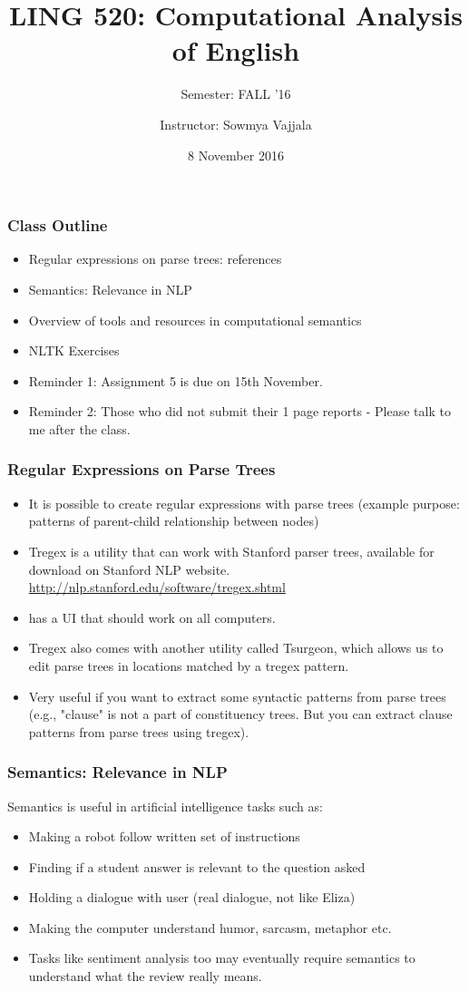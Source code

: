 \documentclass{beamer}
\author[Sowmya Vajjala]{Instructor: Sowmya Vajjala}
\title[LING 520]{LING 520: Computational Analysis of English}
\subtitle{Semester: FALL '16}
\date{8 November 2016}
\institute{Iowa State University, USA}
\begin{document}
\begin{frame}\titlepage
\end{frame}

\begin{frame}
\frametitle{Class Outline}
\begin{itemize}
\item Regular expressions on parse trees: references %
\item Semantics: Relevance in NLP %
\item Overview of tools and resources in computational semantics %
\item NLTK Exercises%
\item Reminder 1: Assignment 5 is due on 15th November.
\item Reminder 2: Those who did not submit their 1 page reports - Please talk to me after the class.
\end{itemize}
\end{frame}

\begin{frame}
\frametitle{Regular Expressions on Parse Trees}
\begin{itemize}
\item It is possible to create regular expressions with parse trees (example purpose: patterns of parent-child relationship between nodes) 
\item Tregex is a utility that can work with Stanford parser trees, available for download on Stanford NLP website. \\ \url{http://nlp.stanford.edu/software/tregex.shtml}
\item has a UI that should work on all computers.
\item Tregex also comes with another utility called Tsurgeon, which allows us to edit parse trees in locations matched by a tregex pattern.\pause
\item Very useful if you want to extract some syntactic patterns from parse trees (e.g., "clause" is not a part of constituency trees. But you can extract clause patterns from parse trees using tregex).
\end{itemize}
\end{frame}

\begin{frame}
\frametitle{Semantics: Relevance in NLP}
Semantics is useful in artificial intelligence tasks such as:
\begin{itemize}
\item Making a robot follow written set of instructions 
\item Finding if a student answer is relevant to the question asked
\item Holding a dialogue with user (real dialogue, not like Eliza)
\item Making the computer understand humor, sarcasm, metaphor etc.
\item Tasks like sentiment analysis too may eventually require semantics to understand what the review really means. 
\end{itemize}
\end{frame}
\end{document}

